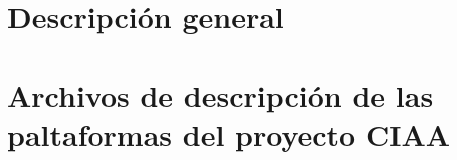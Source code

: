 \section{Descripción general} %
\label{sec:implemDescripGral}

\section{Archivos de descripción de las paltaformas del proyecto CIAA}

